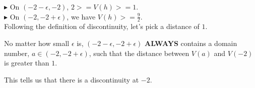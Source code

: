 \documentclass{ximera}
\begin{document}
\begin{explanation}
\begin{itemize}
\end{itemize}



\textbf{\textcolor{red!90!darkgray}{$\blacktriangleright$}} On $(-2 - \epsilon, -2)$, $2 >= V(h) >= 1$. \\

\textbf{\textcolor{red!90!darkgray}{$\blacktriangleright$}} On $(-2, -2 + \epsilon)$, we have $V(h) >=  \frac{9}{2}$. \\




Following the definition of discontinuity, let's pick a distance of $1$.


No matter how small $\epsilon$ is, $(-2 - \epsilon, -2 + \epsilon)$ \textbf{\textcolor{red!90!darkgray}{ALWAYS}} contains a domain number, $a \in (-2, -2 + \epsilon)$, such that the distance between $V(a)$ and $V(-2)$ is greater than $1$.

This tells us that there is a discontinuity at $-2$.

\end{explanation}
\end{document}
